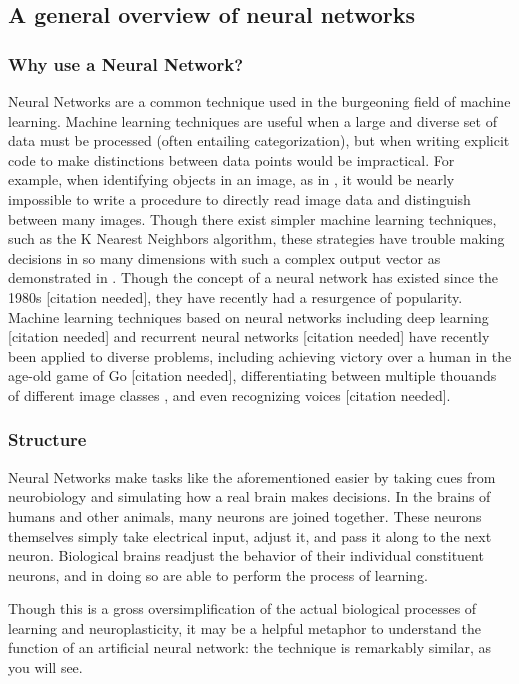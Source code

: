 \documentclass{article}
\begin{document}
\subsection{A general overview of neural networks}
\subsubsection{Why use a Neural Network?}
Neural Networks are a common technique used in the burgeoning field of machine learning. Machine learning techniques are useful when a large and diverse set of data must be processed (often entailing categorization), but when writing explicit code to make distinctions between data points would be impractical. For example, when identifying objects in an image, as in \cite{hinton12}, it would be nearly impossible to write a procedure to directly read image data and distinguish between many images. Though there exist simpler machine learning techniques, such as the K Nearest Neighbors algorithm, these strategies have trouble making decisions in so many dimensions with such a complex output vector as demonstrated in \cite{knnic}. Though the concept of a neural network has existed since the 1980s [citation needed], they have recently had a resurgence of popularity. Machine learning techniques based on neural networks including deep learning [citation needed] and recurrent neural networks [citation needed] have recently been applied to diverse problems, including achieving victory over a human in the age-old game of Go [citation needed], differentiating between multiple thouands of different image classes \cite{hinton12}, and even recognizing voices [citation needed].

\subsubsection{Structure}
Neural Networks make tasks like the aforementioned easier by taking cues from neurobiology and simulating how a real brain makes decisions. In the brains of humans and other animals, many neurons are joined together. These neurons themselves simply take electrical input, adjust it, and pass it along to the next neuron. Biological brains readjust the behavior of their individual constituent neurons, and in doing so are able to perform the process of learning.

Though this is a gross oversimplification of the actual biological processes of learning and neuroplasticity, it may be a helpful metaphor to understand the function of an artificial neural network: the technique is remarkably similar, as you will see.
\end{document}
